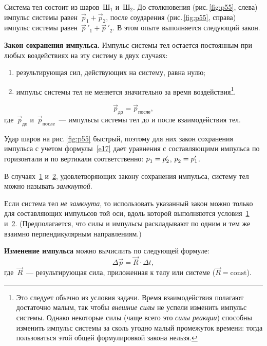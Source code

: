 \documentclass[main.tex]{subfiles}
\begin{document}
Система тел состоит из шаров~Ш$_1$ и~Ш$_2$. До столкновения (рис.\,\ref{fig:p55}, слева) импульс системы равен~$\vec p_1+\vec p_2$, после соударения (рис.\,\ref{fig:p55}, справа) импульс системы равен~$\vec p\,'_{\!1}+\vec p\,'_{\!2}$. В этом опыте выполняется следующий закон.
%
%
\begin{law}
    \textbf{Закон сохранения импульса.} Импульс системы тел остается постоянным при любых воздействиях на эту систему в двух случаях:
    \begin{enumerate}
        \item [1)] \hypertarget{с1}{} результирующая сил, действующих на систему, равна нулю;
        \item [2)] \hypertarget{с2}{} импульс системы тел не меняется значительно за время воздействия\footnote{Это следует обычно из условия задачи. Время взаимодействия полагают достаточно малым, так чтобы \emph{внешние силы} не успели изменить импульс системы. Однако некоторые силы (чаще всего это \emph{силы реакции}) способны изменить импульс системы за сколь угодно малый промежуток времени: тогда пользоваться этой общей формулировкой закона нельзя.}.
    \end{enumerate}
    \begin{equation}
        \vec p_\text{до}=\vec p_\text{после},
    \end{equation}
    где~$\vec p_\text{до}$ и~$\vec p_\text{после}$~--- импульсы системы тел до и после взаимодействия тел. 
\end{law}
%
Удар шаров на рис.\,\ref{fig:p55} быстрый, поэтому для них закон сохранения импульса с учетом формулы~\eqref{e17} дает уравнения с составляющими импульса по горизонтали и по вертикали соответственно: $p^{\vphantom{'}}_\text{1}=p'_{2}$, $p^{\vphantom{'}}_\text{2}=p'_{1}$.

В случаях~\hyperlink{с1}{1} и~\hyperlink{с2}{2}, удовлетворяющих закону сохранения импульса, систему тел можно называть \emph{замкнутой}.

Если система тел \emph{не замкнута}, то использовать указанный закон можно только для составляющих импульсов той оси, вдоль которой выполняются условия~\hyperlink{с1}{1} и~\hyperlink{с2}{2}. (Предполагается, что силы и импульсы раскладывают по одним и тем же взаимно перпендикулярным направлениям.) 

\textbf{Изменение импульса} можно вычислить по следующей формуле:
\begin{equation}
    \Delta \vec p=\vec R\cdot\Delta t,
\end{equation}
где~$\vec R$~--- результирующая сила, приложенная к телу или системе ($\vec R=\mathrm{const}$).











 
\end{document}
